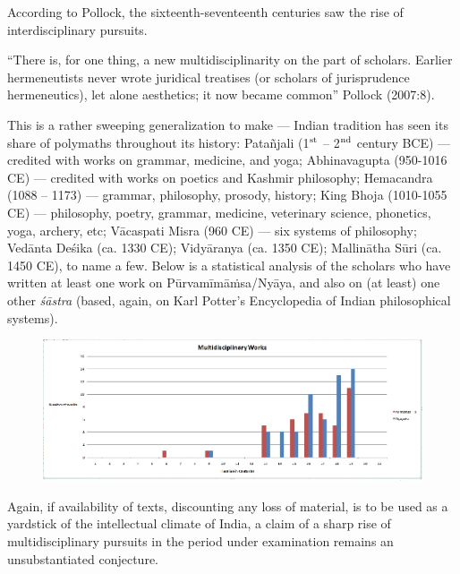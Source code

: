 According to Pollock, the sixteenth-seventeenth centuries saw the rise of interdisciplinary pursuits.

 “There is, for one thing, a new multidisciplinarity on the part of scholars. Earlier hermeneutists never wrote juridical treatises (or scholars of jurisprudence hermeneutics), let alone aesthetics; it now became common” Pollock (2007:8).

This is a rather sweeping generalization to make — Indian tradition has seen its share of polymaths throughout its history: Patañjali (1$^{\rm st}$ – 2$^{\rm nd}$ century BCE) — credited with works on grammar, medicine, and yoga; Abhinavagupta (950-1016 CE) — credited with works on poetics and Kashmir philosophy; Hemacandra (1088 – 1173) — grammar, philosophy, prosody, history; King Bhoja (1010-1055 CE) — philosophy, poetry, grammar, medicine, veterinary science, phonetics, yoga, archery, etc; Vācaspati Misra (960 CE) — six systems of philosophy; Vedānta Deśika (ca. 1330 CE); Vidyāranya (ca. 1350 CE); Mallinātha Sūri (ca. 1450 CE), to name a few. Below is a statistical analysis of the scholars who have written at least one work on Pūrvamīmāṁsa/Nyāya, and also on (at least) one other {\sl śāstra} (based, again, on Karl Potter’s Encyclopedia of Indian philosophical systems). 
\begin{figure}[h]
\centering
\includegraphics{figures/fig2.jpeg}
\caption{}\label{chap2-fig2}
\end{figure}


Again, if availability of texts, discounting any loss of material, is to be used as a yardstick of the intellectual climate of India, a claim of a sharp rise of multidisciplinary pursuits in the period under examination remains an unsubstantiated conjecture.

